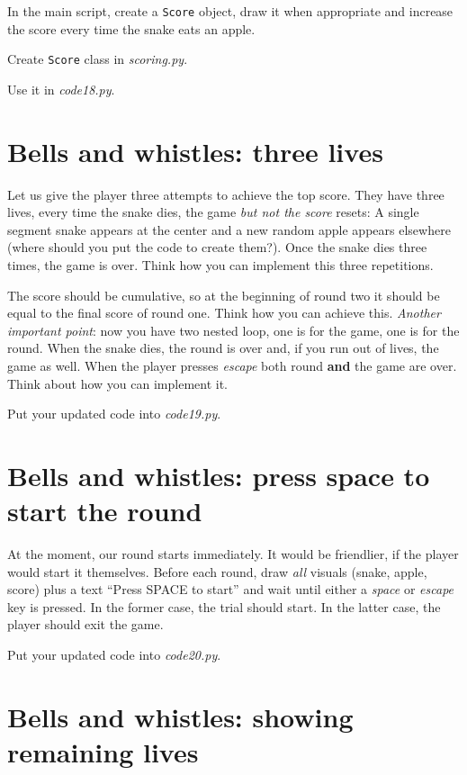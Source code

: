 \documentclass[
]{book}
\begin{document}
In the main script, create a \texttt{Score} object, draw it when appropriate and increase the score every time the snake eats an apple.

Create \texttt{Score} class in \emph{scoring.py}.

Use it in \emph{code18.py}.

\hypertarget{bells-and-whistles-three-lives}{%
\section{Bells and whistles: three lives}\label{bells-and-whistles-three-lives}}

Let us give the player three attempts to achieve the top score. They have three lives, every time the snake dies, the game \emph{but not the score} resets: A single segment snake appears at the center and a new random apple appears elsewhere (where should you put the code to create them?). Once the snake dies three times, the game is over. Think how you can implement this three repetitions.

The score should be cumulative, so at the beginning of round two it should be equal to the final score of round one. Think how you can achieve this. \emph{Another important point}: now you have two nested loop, one is for the game, one is for the round. When the snake dies, the round is over and, if you run out of lives, the game as well. When the player presses \emph{escape} both round \textbf{and} the game are over. Think about how you can implement it.

Put your updated code into \emph{code19.py}.

\hypertarget{bells-and-whistles-press-space-to-start-the-round}{%
\section{Bells and whistles: press space to start the round}\label{bells-and-whistles-press-space-to-start-the-round}}

At the moment, our round starts immediately. It would be friendlier, if the player would start it themselves. Before each round, draw \emph{all} visuals (snake, apple, score) plus a text ``Press SPACE to start'' and wait until either a \emph{space} or \emph{escape} key is pressed. In the former case, the trial should start. In the latter case, the player should exit the game.

Put your updated code into \emph{code20.py}.

\hypertarget{bells-and-whistles-showing-remaining-lives}{%
\section{Bells and whistles: showing remaining lives}\label{bells-and-whistles-showing-remaining-lives}}
\end{document}
